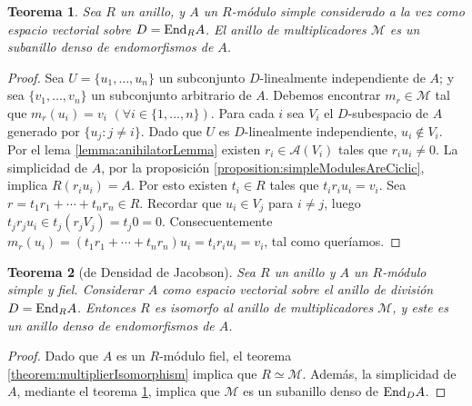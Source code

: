 \documentclass{report}
\newcommand{\End}{\textnormal{End}}
\newtheorem{theorem}{Teorema}
\begin{document}
  \begin{theorem}\label{theorem:denseMultiplierRing}
    Sea \(R\) un anillo, y \(A\) un \(R\)-módulo simple considerado a la vez como espacio vectorial sobre \(D = \End_R A\).
    El anillo de multiplicadores \(\mathcal{M}\) es un subanillo denso de endomorfismos de \(A\).
  \end{theorem}
  \begin{proof}
    Sea \(U = \{u_1, \dots, u_n\}\) un subconjunto \(D\)-linealmente independiente de \(A\);
    y sea \(\{v_1, \dots, v_n\}\) un subconjunto arbitrario de \(A\).
    Debemos encontrar \(m_r \in \mathcal{M}\) tal que \(m_r(u_i) = v_i\) \((\forall i \in \{1, \dots, n\})\).
    Para cada \(i\) sea \(V_i\) el \(D\)-subespacio de \(A\) generado por \(\{u_j : j \neq i\}\).
    Dado que \(U\) es \(D\)-linealmente independiente, \(u_i \notin V_i\).
    Por el lema \ref{lemma:anihilatorLemma} existen \(r_i \in \mathcal{A}(V_i)\) tales que \(r_i u_i \neq 0\).
    La simplicidad de \(A\), por la proposición \ref{proposition:simpleModulesAreCiclic}, implica \(R (r_i u_i) = A\).
    Por esto existen \(t_i \in R\) tales que \(t_i r_i u_i = v_i\).
    Sea \(r = t_1 r_1 + \cdots + t_n r_n \in R\).
    Recordar que \(u_i \in V_j\) para \(i \neq j\), luego \(t_j r_j u_i \in t_j (r_j V_j) = t_j 0 = 0\).
    Consecuentemente \(m_r(u_i) = (t_1 r_1 + \cdots + t_n r_n) u_i = t_i r_i u_i = v_i\), tal como queríamos.
  \end{proof}

  \begin{theorem}[de Densidad de Jacobson]\label{theorem:jacobsonDensityTheorem}
    Sea \(R\) un anillo y \(A\) un \(R\)-módulo simple y fiel.
    Considerar \(A\) como espacio vectorial sobre el anillo de división \(D = \End_R A\).
    Entonces \(R\) es isomorfo al anillo de multiplicadores \(\mathcal{M}\), y este es un anillo denso de endomorfismos de \(A\).
  \end{theorem}
  \begin{proof}
    Dado que \(A\) es un \(R\)-módulo fiel, el teorema \ref{theorem:multiplierIsomorphism} implica que \(R \simeq \mathcal{M}\).
    Además, la simplicidad de \(A\), mediante el teorema \ref{theorem:denseMultiplierRing}, implica que \(\mathcal{M}\) es un subanillo denso de \(\End_D A\).
  \end{proof}
\end{document}
